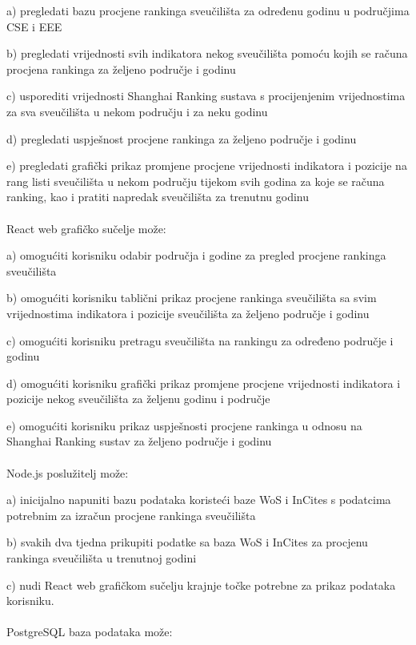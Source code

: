 \documentclass[times, utf8, zavrsni]{fer}
\begin{document}
a) pregledati bazu procjene rankinga sveučilišta za određenu godinu u područjima CSE i EEE

b) pregledati vrijednosti svih indikatora nekog sveučilišta pomoću kojih se računa procjena rankinga za željeno područje i godinu

c) usporediti vrijednosti Shanghai Ranking sustava s procijenjenim vrijednostima za sva sveučilišta u nekom području i za neku godinu

d) pregledati uspješnost procjene rankinga za željeno područje i godinu

e) pregledati grafički prikaz promjene procjene vrijednosti indikatora i pozicije na rang listi sveučilišta u nekom području tijekom svih godina 
za koje se računa ranking, kao i pratiti napredak sveučilišta za trenutnu godinu
\\
\\React web grafičko sučelje može:

a) omogućiti korisniku odabir područja i godine za pregled procjene rankinga sveučilišta

b) omogućiti korisniku tablični prikaz procjene rankinga sveučilišta sa svim \\vrijednostima indikatora i pozicije sveučilišta za željeno područje i godinu

c) omogućiti korisniku pretragu sveučilišta na rankingu za određeno područje i godinu

d) omogućiti korisniku grafički prikaz  promjene procjene vrijednosti indikatora i pozicije nekog sveučilišta za željenu godinu i područje

e) omogućiti korisniku prikaz uspješnosti procjene rankinga u odnosu na Shanghai Ranking sustav za željeno područje i godinu
\\
\\Node.js poslužitelj može:

a) inicijalno napuniti bazu podataka koristeći baze WoS i InCites s podatcima potrebnim za izračun procjene rankinga sveučilišta

b) svakih dva tjedna prikupiti podatke sa baza WoS i InCites za procjenu rankinga sveučilišta u trenutnoj godini

c) nudi React web grafičkom sučelju krajnje točke potrebne za prikaz podataka korisniku.
\\
\\PostgreSQL baza podataka može:
\end{document}
